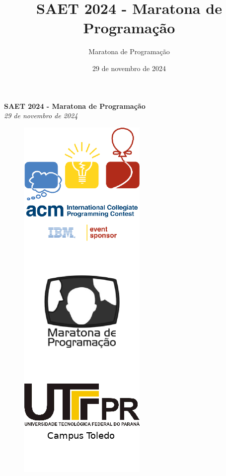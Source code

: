 \documentclass[12pt,oneside]{article} %
\title{SAET 2024 - Maratona de Programação}
\author{Maratona de Programação}
\date{29 de novembro de 2024}
\begin{document}
\begin{center}
\textbf{\Huge SAET 2024 - Maratona de Programação} \\
\vspace{0.2cm}
\textit{29 de novembro de 2024} \\
\vspace{1.0cm}
\begin{figure}[h!]
	\centering
 \includegraphics[scale=0.95]{capa.png}
\end{figure}
\vspace{1.0cm}
\vspace{1.0cm}
\end{center}
\end{document}
